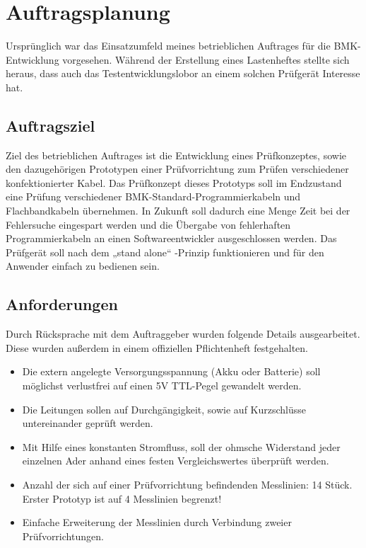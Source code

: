 \section{Auftragsplanung}

Ursprünglich war das Einsatzumfeld meines betrieblichen Auftrages für die BMK-Entwicklung vorgesehen. Während der Erstellung eines Lastenheftes stellte sich heraus, dass auch das Testentwicklungslobor an einem solchen Prüfgerät Interesse hat. 



\subsection{Auftragsziel}

Ziel des betrieblichen Auftrages ist die Entwicklung eines Prüfkonzeptes, sowie den dazugehörigen Prototypen einer Prüfvorrichtung zum Prüfen verschiedener konfektionierter Kabel. Das Prüfkonzept dieses Prototyps soll im Endzustand eine Prüfung verschiedener BMK-Standard-Programmierkabeln und Flachbandkabeln übernehmen. 
In Zukunft soll dadurch eine Menge Zeit bei der Fehlersuche eingespart werden und die Übergabe von fehlerhaften Programmierkabeln an einen Softwareentwickler ausgeschlossen werden.
Das Prüfgerät soll nach dem „stand alone“ -Prinzip funktionieren und für den Anwender einfach zu bedienen sein.


\subsection{Anforderungen}

Durch Rücksprache mit dem Auftraggeber wurden folgende Details ausgearbeitet. Diese wurden außerdem in einem offiziellen Pflichtenheft festgehalten. 

\begin{itemize}
	\item{Die extern angelegte Versorgungsspannung (Akku oder Batterie) soll möglichst verlustfrei auf einen 5V TTL-Pegel gewandelt werden. }

	\item{Die Leitungen sollen auf Durchgängigkeit, sowie auf Kurzschlüsse untereinander geprüft werden.}
	
	\item{Mit Hilfe eines konstanten Stromfluss, soll der ohmsche Widerstand jeder einzelnen Ader anhand eines festen Vergleichswertes überprüft werden.}
	
	\item{Anzahl der sich auf einer Prüfvorrichtung befindenden Messlinien: 14 Stück.
Erster Prototyp ist auf 4 Messlinien begrenzt!}

	\item{Einfache Erweiterung der Messlinien durch Verbindung zweier Prüfvorrichtungen.}
\end{itemize}


